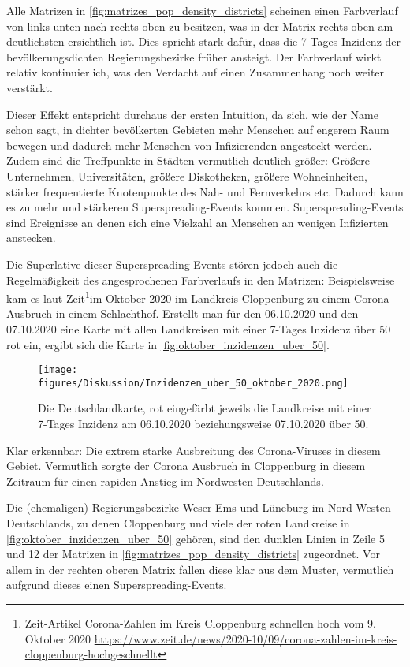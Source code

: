 Alle Matrizen in \autoref{fig:matrizes_pop_density_districts} scheinen einen Farbverlauf von links unten nach rechts oben zu besitzen, was in der Matrix rechts oben am deutlichsten ersichtlich ist. Dies spricht stark dafür, dass die 7-Tages Inzidenz der bevölkerungsdichten Regierungsbezirke früher ansteigt. Der Farbverlauf wirkt relativ kontinuierlich, was den Verdacht auf einen Zusammenhang noch weiter verstärkt.

Dieser Effekt entspricht durchaus der ersten Intuition, da sich, wie der Name schon sagt, in dichter bevölkerten Gebieten mehr Menschen auf engerem Raum bewegen und dadurch mehr Menschen von Infizierenden angesteckt werden.
Zudem sind die Treffpunkte in Städten vermutlich deutlich größer: Größere Unternehmen, Universitäten, größere Diskotheken, größere Wohneinheiten, stärker frequentierte Knotenpunkte des Nah- und Fernverkehrs etc. Dadurch kann es zu mehr und stärkeren Superspreading-Events kommen. Superspreading-Events sind Ereignisse an denen sich eine Vielzahl an Menschen an wenigen Infizierten anstecken.

Die Superlative dieser Superspreading-Events stören jedoch auch die Regelmäßigkeit des angesprochenen Farbverlaufs in den Matrizen: Beispielsweise kam es laut Zeit\footnote{
Zeit-Artikel \glqq{}Corona-Zahlen im Kreis Cloppenburg schnellen hoch\grqq{} vom 9. Oktober 2020
\href{https://www.zeit.de/news/2020-10/09/corona-zahlen-im-kreis-cloppenburg-hochgeschnellt}{
https://www.zeit.de/news/2020-10/09/corona-zahlen-im-kreis-cloppenburg-hochgeschnellt}}im Oktober 2020 im Landkreis Cloppenburg zu einem Corona Ausbruch in einem Schlachthof. Erstellt man für den 06.10.2020 und den 07.10.2020 eine Karte mit allen Landkreisen mit einer 7-Tages Inzidenz über 50 rot ein, ergibt sich die Karte in \autoref{fig:oktober_inzidenzen_uber_50}.

\begin{figure}[H]
    \centering
    \texttt{[image: figures/Diskussion/Inzidenzen\_uber\_50\_oktober\_2020.png]}
    \caption{Die Deutschlandkarte, rot eingefärbt jeweils die Landkreise mit einer 7-Tages Inzidenz am 06.10.2020 beziehungsweise 07.10.2020 über 50.}
    \label{fig:oktober_inzidenzen_uber_50}
\end{figure}
Klar erkennbar: Die extrem starke Ausbreitung des Corona-Viruses in diesem Gebiet. Vermutlich sorgte der Corona Ausbruch in Cloppenburg in diesem Zeitraum für einen rapiden Anstieg im Nordwesten Deutschlands.

Die (ehemaligen) Regierungsbezirke Weser-Ems und Lüneburg im Nord-Westen Deutschlands, zu denen Cloppenburg und viele der roten Landkreise in \autoref{fig:oktober_inzidenzen_uber_50} gehören, sind den dunklen Linien in Zeile 5 und 12 der Matrizen in \autoref{fig:matrizes_pop_density_districts} zugeordnet. Vor allem in der rechten oberen Matrix fallen diese klar aus dem Muster, vermutlich aufgrund dieses einen Superspreading-Events.

